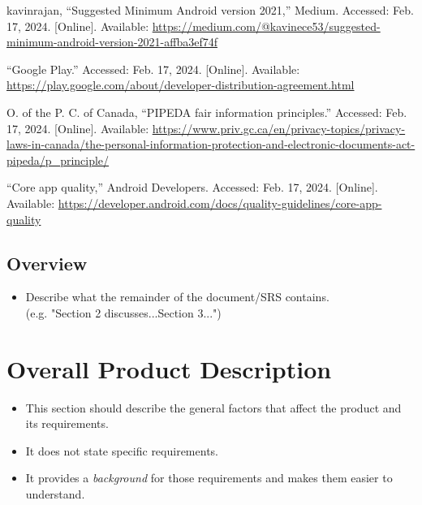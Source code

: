 \documentclass[]{article}
\begin{document}
\begin{itemize}
\begin{thebibliography}{99}
         kavinrajan, “Suggested Minimum Android version 2021,” Medium. Accessed: Feb. 17, 2024. [Online]. Available: \url{https://medium.com/@kavinece53/suggested-minimum-android-version-2021-affba3ef74f}
        
         “Google Play.” Accessed: Feb. 17, 2024. [Online]. Available: \url{https://play.google.com/about/developer-distribution-agreement.html}
        
         O. of the P. C. of Canada, “PIPEDA fair information principles.” Accessed: Feb. 17, 2024. [Online]. Available: \url{https://www.priv.gc.ca/en/privacy-topics/privacy-laws-in-canada/the-personal-information-protection-and-electronic-documents-act-pipeda/p_principle/}
        
         “Core app quality,” Android Developers. Accessed: Feb. 17, 2024. [Online]. Available: \url{https://developer.android.com/docs/quality-guidelines/core-app-quality}
    \end{thebibliography}
\end{itemize}
\subsection{Overview}
\label{sub:overview}
\begin{itemize}
    \item Describe what the remainder of the document/SRS contains.\\
    (e.g. "Section 2 discusses...Section 3...")
\end{itemize}
\section{Overall Product Description}
\label{sec:overall_description}
\begin{itemize}
    \item This section should describe the general factors that affect the product and its requirements. 
    \item It does not state specific requirements.
    \item It provides a \emph{background} for those requirements and makes them easier to understand.
\end{itemize}
\end{document}

